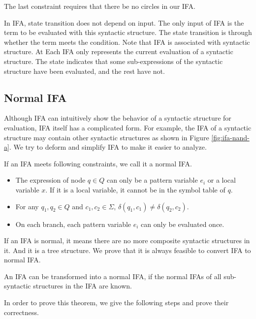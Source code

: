 The last constraint requires that there be no circles in our IFA.

In IFA, state transition does not depend on input. The only input of IFA is the term to be evaluated with this syntactic structure. The state transition is through whether the term meets the condition. Note that IFA is associated with syntactic structure. At Each IFA only represents the current evaluation of a syntactic structure. The state indicates that some sub-expressions of the syntactic structure have been evaluated, and the rest have not.

\subsection{Normal IFA}

Although IFA can intuitively show the behavior of a syntactic structure for evaluation, IFA itself has a complicated form. For example, the IFA of a syntactic structure may contain other syntactic structures as shown in Figure \ref{fig:ifa-nand-a}. We try to deform and simplify IFA to make it easier to analyze.

\begin{Def}
\label{def:nmlifa}
If an IFA meets following constraints, we call it a normal IFA.
\begin{itemize}
    \item The expression of node $q \in Q$ can only be a pattern variable $e_i$ or a local variable $x$. If it is a local variable, it cannot be in the symbol table of $q$.
    \item For any $q_1,q_2 \in Q$ and $c_1, c_2 \in \Sigma$, $\delta(q_1, c_1) \neq \delta(q_2, c_2)$.
    \item On each branch, each pattern variable $e_i$ can only be evaluated once.
\end{itemize}
\end{Def}

If an IFA is normal, it means there are no more composite syntactic structures in it. And it is a tree structure. We  prove that it is always feasible to convert IFA to normal IFA.

\begin{mythm}
\label{mythm:nmlifa}
An IFA can be transformed into a normal IFA, if the normal IFAs of all sub-syntactic structures in the IFA are known.
\end{mythm}

In order to prove this theorem, we give the following steps and prove their correctness.

